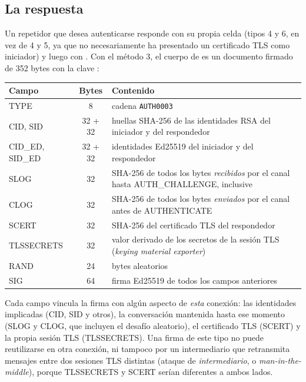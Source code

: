 \subsection{La respuesta}

Un repetidor que desea autenticarse responde con su propia celda  (tipos 4 y 6, en vez de 4 y 5, ya que no necesariamente ha presentado un certificado TLS como iniciador) y luego con . Con el método 3, el cuerpo de  es un documento firmado de 352 bytes con la clave :

\begin{center}\small
\begin{tabularx}{\textwidth}{@{}l c >{\raggedright\arraybackslash}X@{}}
\toprule
Campo & Bytes & Contenido \\
\midrule
TYPE & 8 & cadena \texttt{AUTH0003} \\
CID, SID & 32 + 32 & huellas SHA-256 de las identidades RSA del iniciador y del respondedor \\
CID\_ED, SID\_ED & 32 + 32 & identidades Ed25519 del iniciador y del respondedor \\
SLOG & 32 & SHA-256 de todos los bytes \emph{recibidos} por el canal hasta AUTH\_CHALLENGE, inclusive \\
CLOG & 32 & SHA-256 de todos los bytes \emph{enviados} por el canal antes de AUTHENTICATE \\
SCERT & 32 & SHA-256 del certificado TLS del respondedor \\
TLSSECRETS & 32 & valor derivado de los secretos de la sesión TLS (\emph{keying material exporter}) \\
RAND & 24 & bytes aleatorios \\
SIG & 64 & firma Ed25519 de todos los campos anteriores \\
\bottomrule
\end{tabularx}
\end{center}

Cada campo vincula la firma con algún aspecto de \emph{esta} conexión: las identidades implicadas (CID, SID y otros), la conversación mantenida hasta ese momento (SLOG y CLOG, que incluyen el desafío aleatorio), el certificado TLS (SCERT) y la propia sesión TLS (TLSSECRETS). Una firma de este tipo no puede reutilizarse en otra conexión, ni tampoco por un intermediario que retransmita mensajes entre dos sesiones TLS distintas (ataque de \emph{intermediario}, o \emph{man-in-the-middle}), porque TLSSECRETS y SCERT serían diferentes a ambos lados.


